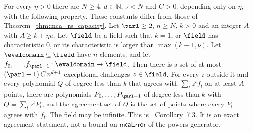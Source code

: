 \begin{theorem}\label{thm:power_batching_capacity}
\leanok
{}
    For every $\eta>0$ there are $N\ge4$, $d\in\mathbb{N}$, $\nu<N$ and $C>0$, depending only on
    $\eta$, with the following property. These constants differ from those of
    Theorem~\ref{thm:mca_rs_capacity}. Let $\parl\ge2$, $n\ge N$, $k>0$ and an integer $A$ with
    $A\ge k+\eta n$. Let $\field$ be a field such that $k=1$, or $\field$ has characteristic $0$,
    or its characteristic is larger than $\max(k-1,\nu)$. Let $\evaldomain\subseteq\field$ have
    $n$ elements, and let $f_0,\ldots,f_{\parl-1}:\evaldomain\to\field$. Then there is a set of at
    most $(\parl-1)\,C\,n^{d+1}$ exceptional challenges $z\in\field$. For every $z$ outside it and
    every polynomial $Q$ of degree less than $k$ that agrees with $\sum_{t}z^t f_t$ on at least $A$
    points, there are polynomials $P_0,\ldots,P_{\parl-1}$ of degree less than $k$ with
    $Q=\sum_t z^t P_t$, and the agreement set of $Q$ is the set of points where every $P_t$ agrees
    with $f_t$. The field may be infinite. This is \cite{DKT26}, Corollary~7.3. It is an exact
    agreement statement, not a bound on $\mathsf{mcaError}$ of the powers generator.
\end{theorem}

